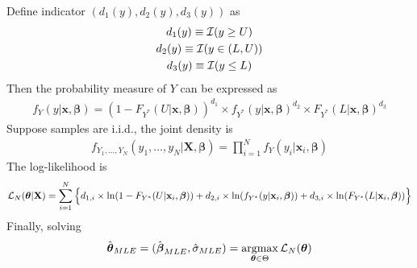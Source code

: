 \documentclass[11pt]{article}
\newcommand{\bm}[1]{\boldsymbol{#1}}
\DeclareMathOperator*{\argmax}{argmax}
\begin{document}
		Define indicator $(d_1(y), d_2(y), d_3(y))$ as 
		\begin{gather}
			d_1(y) \equiv \mathcal{{I}}(y \geq U) \\
			d_2(y) \equiv \mathcal{{I}}(y \in (L, U)) \\
			d_3(y) \equiv \mathcal{{I}}(y \leq L)
		\end{gather}
		Then the probability measure of $Y$ can be expressed as
		\begin{gather}
			f_Y(y|\textbf{x}, \bm{\beta}) 
			= (1 - F_{Y^*}(U|\textbf{x}, \bm{\beta}))^{d_1} 
			\times f_{Y^*}(y|\textbf{x}, \bm{\beta}) ^ {d_2} 
			\times F_{Y^*}(L|\textbf{x}, \bm{\beta})^{d_3}
		\end{gather}
		Suppose samples are i.i.d., the joint density is
		\begin{gather}
			f_{Y_1, \dots, Y_N}(y_1, \dots, y_N|\textbf{X}, \bm{\beta}) = \prod_{i=1}^N f_Y (y_i|\textbf{x}_i, \bm{\beta})
		\end{gather}
		The log-likelihood is
		\begin{gather}
			\mc{L}_N (\bm{\theta}|\textbf{X}) = \sum_{i=1}^N \Big\{
			d_{1,i} \times \ln(1 - F_{Y^*}(U|\textbf{x}_i, \bm{\beta})) + d_{2,i} \times \ln(f_{Y^*}(y|\textbf{x}_i, \bm{\beta})) + d_{3,i} \times \ln(F_{Y^*}(L|\textbf{x}_i, \bm{\beta}))
			\Big\}
		\end{gather}
		Finally, solving
		\begin{equation}
			\hat{\bm{\theta}}_{MLE}
			= (\hat{\bm{\beta}}_{MLE}, \hat{\sigma}_{MLE}) = \argmax_{\bm{\theta} \in \Theta} \mc{L}_N (\bm{\theta})
		\end{equation}
		
\end{document}
